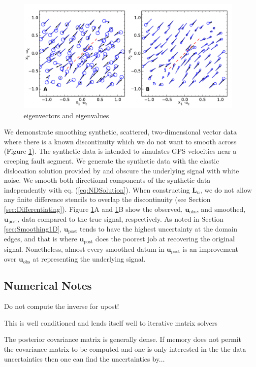 \documentclass[10pt,a4paper]{article}
\begin{document}
\begin{figure}
\includegraphics[scale=1.0]{figures/figure4}
\caption{eigenvectors and eigenvalues}   
\label{fig:Demo3}
\end{figure}

We demonstrate smoothing synthetic, scattered, two-dimensional vector data where there is a known discontinuity which we do not want to smooth across (Figure \ref{fig:Demo3}). The synthetic data is intended to simulates GPS velocities near a creeping fault segment. We generate the synthetic data with the elastic dislocation solution provided by \citet{Okada1992} and obscure the underlying signal with white noise. We smooth both directional components of the synthetic data independently with eq. (\ref{eq:NDSolution}).  When constructing $\mathbf{L}_n$, we do not allow any finite difference stencils to overlap the discontinuity (see Section \ref{sec:Differentiating}).  Figure \ref{fig:Demo3}A and \ref{fig:Demo3}B show the observed, $\mathbf{u}_\mathrm{obs}$, and smoothed, $\mathbf{u}_\mathrm{post}$, data compared to the true signal, respectively.  As noted in Section \ref{sec:Smoothing1D}, $\mathbf{u}_\mathrm{post}$ tends to have the highest uncertainty at the domain edges, and that is where $\mathbf{u}_\mathrm{post}$ does the poorest job at recovering the original signal.  Nonetheless, almost every smoothed datum in $\mathbf{u}_\mathrm{post}$ is an improvement over $\mathbf{u}_\mathrm{obs}$ at representing the underlying signal. 

\subsection{Numerical Notes}
Do not compute the inverse for upost!

This is well conditioned and lends itself well to iterative matrix solvers

The posterior covariance matrix is generally dense.  If memory does not permit the covariance matrix to be computed and one is only interested in the the data uncertainties then one can find the uncertainties by...
\end{document}
